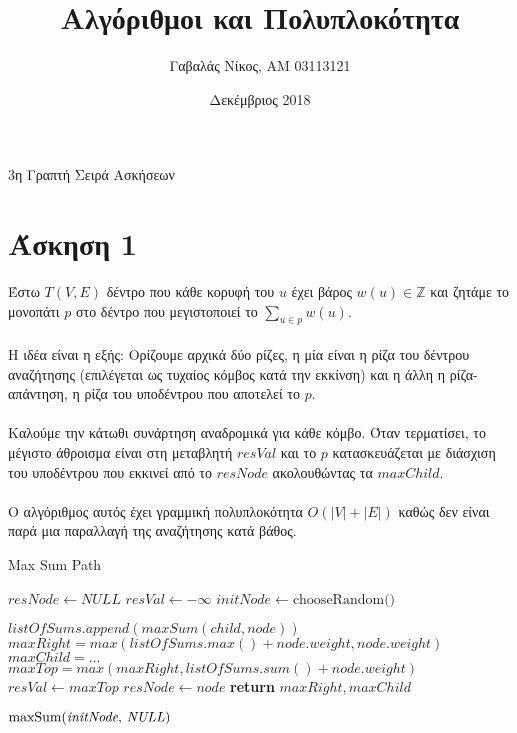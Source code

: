 \documentclass[12pt,a4paper]{article}
\title{Αλγόριθμοι και Πολυπλοκότητα}
\author{Γαβαλάς Νίκος, AM 03113121}
\date{Δεκέμβριος 2018}
\begin{document}
  \maketitle

  \begin{center}
    \Large{3η Γραπτή Σειρά Ασκήσεων}
  \end{center}

  \section{Άσκηση 1}

  Έστω \(T(V, E)\) δέντρο που κάθε κορυφή του \(u\) έχει βάρος \(w(u) \in 
  \mathbb{Z}\) και ζητάμε το μονοπάτι \(p\) στο δέντρο που μεγιστοποιεί το
  \(\sum_{u \in p}{w(u)}\).
  \\
  \\
  Η ιδέα είναι η εξής: Ορίζουμε αρχικά δύο ρίζες, η μία είναι η ρίζα του δέντρου
  αναζήτησης (επιλέγεται ως τυχαίος κόμβος κατά την εκκίνση) και η άλλη η 
  ρίζα-απάντηση, η ρίζα του υποδέντρου που αποτελεί το \(p\).
  \\
  \\
  Καλούμε την κάτωθι συνάρτηση αναδρομικά για κάθε κόμβο. Όταν τερματίσει,
  το μέγιστο άθροισμα είναι στη μεταβλητή \(resVal\) και το \(p\)
  κατασκευάζεται με διάσχιση του υποδέντρου που εκκινεί από το \(resNode\)
  ακολουθώντας τα \(maxChild\).
  \\
  \\
  Ο αλγόριθμος αυτός έχει γραμμική πολυπλοκότητα \( O(|V| + |E|)\) καθώς δεν
  είναι παρά μια παραλλαγή της αναζήτησης κατά βάθος.

  {\latintext
  \begin{algorithm}
    \caption{Max Sum Path}\label{euclid}
    \begin{algorithmic}[1]
      
    \State $resNode \gets NULL$
    \State $resVal \gets \textit{\(-\infty\)}$
    \State $initNode \gets \text{chooseRandom()}$
    
      \EndIf
        \State $listOfSums.append(maxSum(child, node))$
      \EndFor
      \State $maxRight = max(listOfSums.max() + node.weight, node.weight)$
      \State $maxChild = ...$
      \State $maxTop = max(maxRight, listOfSums.sum() + node.weight)$ 
        \State $resVal \gets maxTop$
        \State $resNode \gets node$
      \EndIf
      \State \textbf{return} $maxRight, maxChild$
      \EndFunction

    \State $\text{maxSum(\textit{initNode}, \textit{NULL})}$

    \end{algorithmic}
  \end{algorithm}
  }
\end{document}
